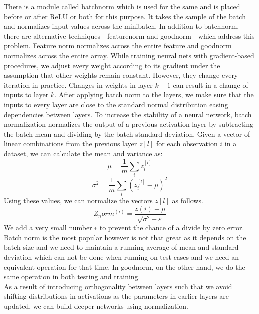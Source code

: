 There is a module called batchnorm which is used for the same and is placed before or after ReLU or both for this purpose. 
It takes the sample of the batch and normalizes input values across the minibatch. 
In addition to batchnorm, there are alternative techniques - featurenorm and goodnorm - which address this problem. 
Feature norm normalizes across the entire feature and goodnorm normalizes across the entire array.
While training neural nets with gradient-based procedures, we adjust every weight according to its gradient under the assumption that other weights remain constant. 
However, they change every iteration in practice. Changes in weights in layer $k-1$ can result in a change of inputs to layer $k$. 
After applying batch norm to the layers, we make sure that the inputs to every layer are close to the standard normal distribution easing dependencies between layers. 
To increase the stability of a neural network, batch normalization normalizes the output of a previous activation layer by subtracting the batch mean and dividing by the batch standard deviation. 
Given a vector of linear combinations from the previous layer $z[l]$ for each observation $i$ in a dataset, we can calculate the mean and variance as: 
\begin{equation}
    \mu = \frac{1}{m} \sum_i z_i^{[l]}
\end{equation}
\begin{equation}
    \sigma^2 = \frac{1}{m} \sum_i (z_i^{[l]} - \mu)^2
\end{equation}
Using these values, we can normalize the vectors $z[l]$ as follows.
\begin{equation}
    Z_norm^(i) = \dfrac{z(i) - \mu}{\sqrt{\sigma^2+\varepsilon}}
\end{equation}
We add a very small number ϵ to prevent the chance of a divide by zero error.\\

Batch norm is the most popular however is not that great as it depends on the batch size and we need to maintain a running average of mean and standard deviation which can not be done when running on test cases and we need an equivalent operation for that time. 
In goodnorm, on the other hand, we do the same operation in both testing and training. \\

As a result of introducing orthogonality between layers such that we avoid shifting distributions in activations as the parameters in earlier layers are updated, we can build deeper networks using normalization.\\

